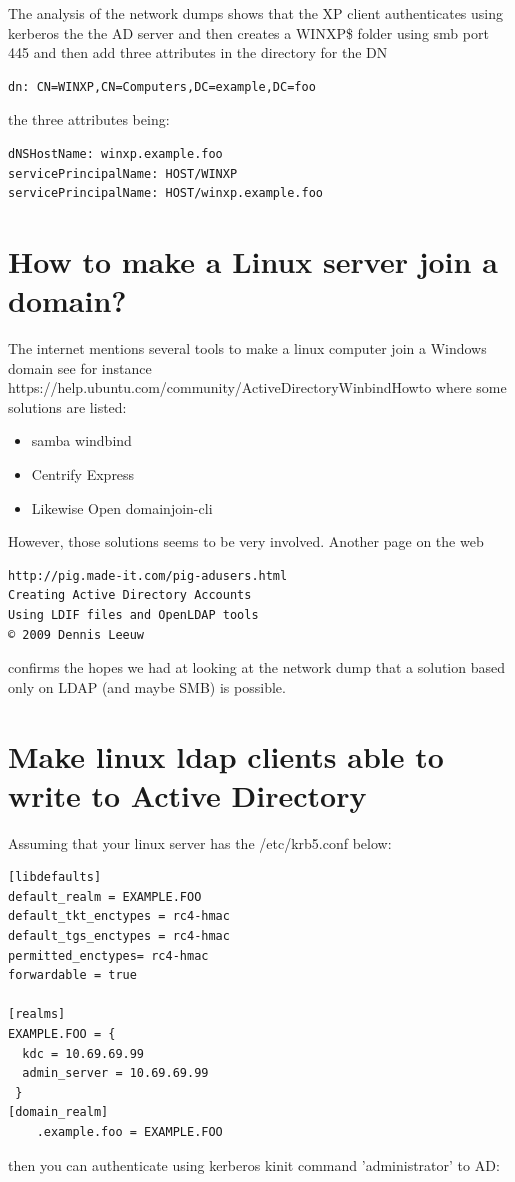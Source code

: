 \documentclass[12pt,a4]{article}
\begin{document}
The analysis of the network dumps shows that the XP client authenticates using kerberos the the AD server and then creates a WINXP\$ folder using smb port 445 and then add three attributes in the directory for the DN

\begin{verbatim}
dn: CN=WINXP,CN=Computers,DC=example,DC=foo
\end{verbatim}

the three attributes being:

\begin{verbatim}
dNSHostName: winxp.example.foo
servicePrincipalName: HOST/WINXP
servicePrincipalName: HOST/winxp.example.foo
\end{verbatim}

\section{How to make a Linux server join a domain?}
The internet mentions several tools to make a linux computer join a Windows domain see for instance
https://help.ubuntu.com/community/ActiveDirectoryWinbindHowto
where some solutions are listed:
\begin{itemize}
\item samba windbind
\item Centrify Express
\item Likewise Open domainjoin-cli
\end{itemize}
However, those solutions seems to be very involved. Another page on the web 

\begin{verbatim}
http://pig.made-it.com/pig-adusers.html
Creating Active Directory Accounts
Using LDIF files and OpenLDAP tools
© 2009 Dennis Leeuw
\end{verbatim}
confirms the hopes we had at looking at the network dump that a solution based only on LDAP (and maybe SMB) is possible.

\section{Make linux ldap clients able to write to Active Directory}
Assuming that your linux server has the /etc/krb5.conf below:

\begin{verbatim}
[libdefaults]
default_realm = EXAMPLE.FOO
default_tkt_enctypes = rc4-hmac
default_tgs_enctypes = rc4-hmac
permitted_enctypes= rc4-hmac
forwardable = true

[realms]
EXAMPLE.FOO = {
  kdc = 10.69.69.99
  admin_server = 10.69.69.99
 }
[domain_realm]
	.example.foo = EXAMPLE.FOO
\end{verbatim}
then you can authenticate using kerberos kinit command 'administrator' to AD:
\end{document}
